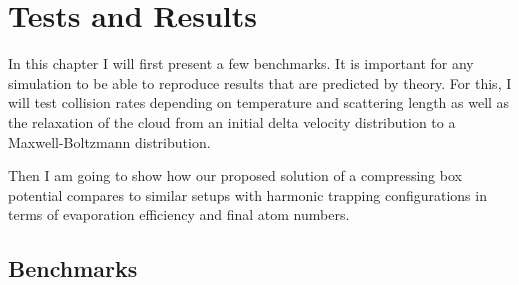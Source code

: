 

\chapter{Tests and Results}

In this chapter I will first present a few benchmarks. It is important for any simulation to be able to reproduce results that are predicted by theory. For this, I will test collision rates depending on temperature and scattering length as well as the relaxation of the cloud from an initial delta velocity distribution to a Maxwell-Boltzmann distribution. 

Then I am going to show how our proposed solution of a compressing box potential compares to similar setups with harmonic trapping configurations in terms of evaporation efficiency and final atom numbers.


\section{Benchmarks}

